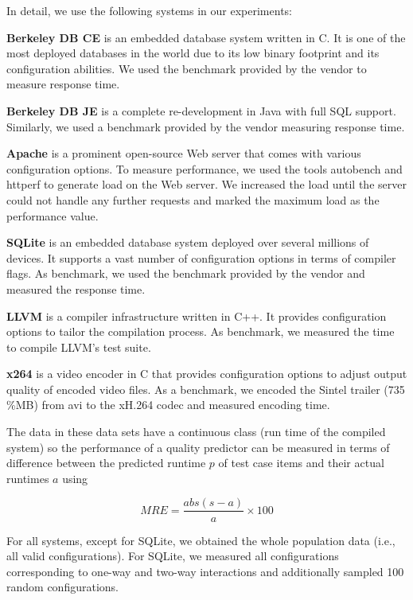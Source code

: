\documentclass{sig-alternative}
\begin{document}
In detail, we use the following systems in our experiments:
\begin{compactitem}
\item \textbf{Berkeley DB CE} is an embedded database system written in C. It is one of the most deployed databases in the world due to its low binary footprint and its configuration abilities. We used the benchmark provided by the vendor to measure response time.
\item \textbf{Berkeley DB JE} is a complete re-development in Java with full SQL support. Similarly, we used a benchmark provided by the vendor measuring response time.
\item \textbf{Apache} is a prominent open-source Web server that comes with various configuration options. To measure performance, we used the tools autobench and httperf to generate load on the Web server. We increased the load until the server could not handle any further requests and marked the maximum load as the performance value.
\item \textbf{SQLite} is an embedded database system deployed over several millions of devices. It supports a vast number of configuration options in terms of compiler flags. As benchmark, we used the benchmark provided by the vendor and measured the response time.
\item \textbf{LLVM} is a compiler infrastructure written in C++. It provides configuration options to tailor the compilation process. As benchmark, we measured the time to compile LLVM's test suite.
\item \textbf{x264} is a video encoder in C that provides configuration options to adjust output quality of encoded video files. As a benchmark, we encoded the Sintel trailer (735\,\%MB) from avi to the xH.264 codec and measured encoding time.
\end{compactitem}
The data in these
data sets have a continuous class (run time of the compiled system)
so the performance of a quality predictor can be measured in terms
of difference between the predicted runtime $p$ of test case items
and their actual runtimes $a$ using 

\begin{equation}\label{eq:1}
MRE = \frac{abs(s-a)}{a} \times 100
\end{equation}


For all systems, except for SQLite, we obtained the whole population data (i.e., all valid configurations). For SQLite, we measured all configurations corresponding to one-way and two-way interactions and additionally sampled 100 random configurations.
\end{document}
